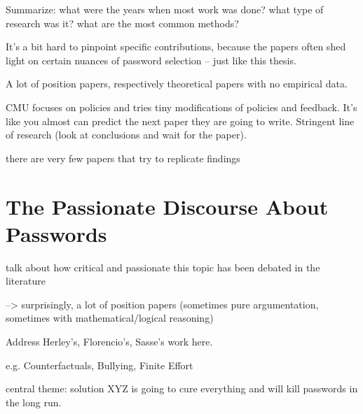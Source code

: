 Summarize: what were the years when most work was done? what type of research was it? what are the most common methods?

It's a bit hard to pinpoint specific contributions, because the papers often shed light on certain nuances of password selection -- just like this thesis.

A lot of position papers, respectively theoretical papers with no empirical data.

CMU focuses on policies and tries tiny modifications of policies and feedback. It's like you almost can predict the next paper they are going to write. Stringent line of research (look at conclusions and wait for the paper).


there are very few papers that try to replicate findings


\section{The Passionate Discourse About Passwords}\label{sec:rw:passionate_discourse}
talk about how critical and passionate this topic has been debated in the literature

--> surprisingly, a lot of position papers (sometimes pure argumentation, sometimes with mathematical/logical reasoning) 

Address Herley's, Florencio's, Sasse's work here. 

e.g. Counterfactuals, Bullying, Finite Effort 


central theme: solution XYZ is going to cure everything and will kill passwords in the long run. 


